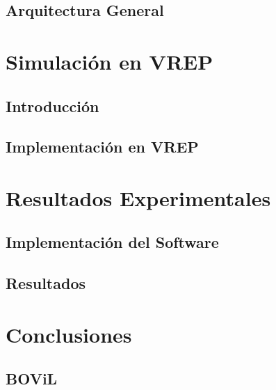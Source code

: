 \documentclass[11pt, oneside]{book} %
\begin{document}
\section{Arquitectura General} \label{sec:SoftArch}



\chapter{Simulaci\'on en VREP}
\section{Introducci\'on}


\section{Implementaci\'on en VREP}


\chapter{Resultados Experimentales}
\section{Implementaci\'on del Software}


\section{Resultados}



\chapter{Conclusiones} \label{chap:c6_conclusions}


\begin{appendix}
\chapter{BOViL} \label{chap:c6_bovil}

\end{appendix}
\end{document}
